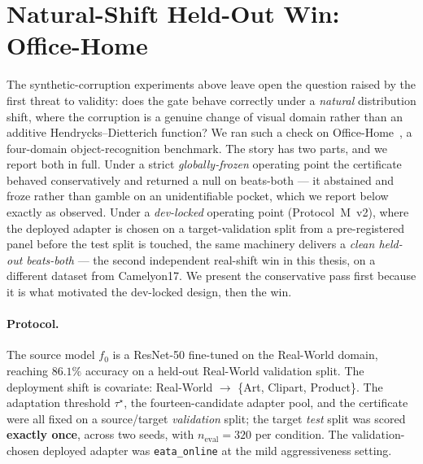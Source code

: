 \section{Natural-Shift Held-Out Win: Office-Home}\label{sec:exp2-officehome}

The synthetic-corruption experiments above leave open the question raised by the
first threat to validity: does the gate behave correctly under a \emph{natural}
distribution shift, where the corruption is a genuine change of visual domain
rather than an additive Hendrycks--Dietterich function?  We ran such a check on
Office-Home~\cite{venkateswara2017officehome}, a four-domain object-recognition
benchmark.  The story has two parts, and we report both in full.  Under a strict
\emph{globally-frozen} operating point the certificate behaved conservatively and
returned a null on beats-both --- it abstained and froze rather than gamble on an
unidentifiable pocket, which we report below exactly as observed.  Under a
\emph{dev-locked} operating point (Protocol~M~v2), where the deployed adapter is
chosen on a target-validation split from a pre-registered panel before the test
split is touched, the same machinery delivers a \emph{clean held-out beats-both} ---
the second independent real-shift win in this thesis, on a different dataset from
Camelyon17.  We present the conservative pass first because it is what motivated
the dev-locked design, then the win.

\paragraph{Protocol.}
The source model $f_0$ is a ResNet-50 fine-tuned on the Real-World domain,
reaching $86.1\%$ accuracy on a held-out Real-World validation split.  The
deployment shift is covariate: Real-World $\rightarrow$ \{Art, Clipart, Product\}.
The adaptation threshold $\tau^\star$, the fourteen-candidate adapter pool, and the
certificate were all fixed on a source/target \emph{validation} split; the target
\emph{test} split was scored \textbf{exactly once}, across two seeds, with
$n_{\text{eval}}=320$ per condition.  The validation-chosen deployed adapter was
\texttt{eata\_online} at the mild aggressiveness setting.

